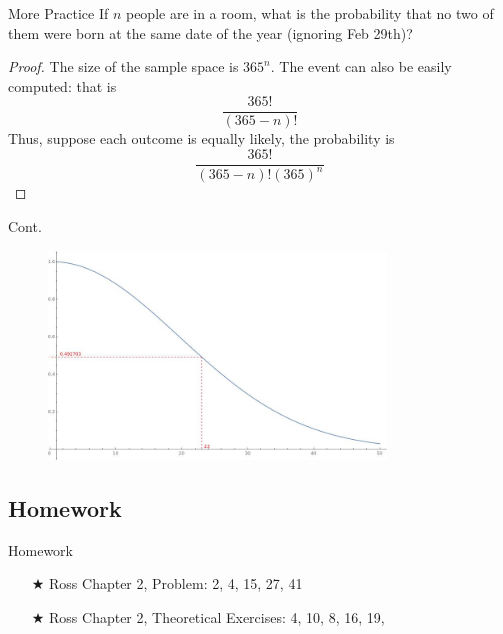 \begin{frame}{More Practice}
	If $n$ people are in a room, what is the probability that no two of them were born at the same date of the year (ignoring Feb 29th)?\pause
	\begin{proof}
		The size of the sample space is $365^n$. The event can also be easily computed: that is 
		\[\frac{365!}{(365-n)!}\]\pause
		Thus, suppose each outcome is equally likely, the probability is 
		\[\frac{365!}{(365-n)!(365)^n}\]
	\end{proof}
\end{frame}
\begin{frame}{Cont.}
	\begin{figure}[ht]
		\centering
		\includegraphics[width=0.8\textwidth]{birthday23.jpeg}
	\end{figure}
\end{frame}

\subsection{Homework}

\begin{frame}{Homework}
	\begin{enumerate}
		\item [$\bigstar$] Ross Chapter 2, Problem: 2, 4, 15, 27, 41
		\item [$\bigstar$] Ross Chapter 2, Theoretical Exercises: 4, 10, 8, 16, 19,
	\end{enumerate}
\end{frame}

